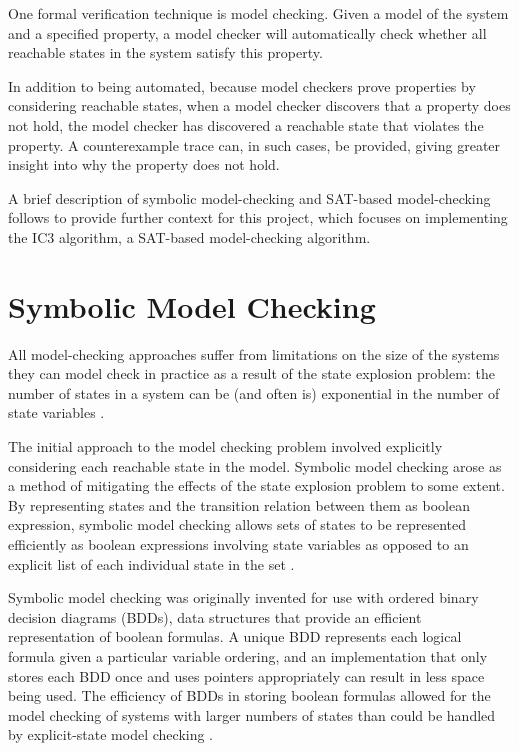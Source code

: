 \documentclass[12pt,a4paper,twoside,openright]{report}
\begin{document}

One formal verification technique is model checking.
Given a model of the system
and a specified property, a model checker will automatically check
whether all reachable states in the system satisfy this property.

In addition to being automated, because model checkers prove
properties by considering reachable states, when a model checker
discovers that a property does not hold, the model checker has
discovered a reachable state that violates the property. A
counterexample trace can, in such cases, be provided, giving
greater insight into why the property does not hold.

A brief description of symbolic model-checking and SAT-based model-checking
follows to provide further context for this project, which focuses on
implementing the IC3 algorithm, a SAT-based model-checking algorithm.


\section{Symbolic Model Checking}

All model-checking approaches suffer from limitations on the size
of the systems they can model check in practice as a result of
the state explosion problem: the number of
states in a system can be (and often is) exponential in the
number of state variables \cite{clarke12}. 

The initial approach to the model checking problem involved explicitly
considering each reachable state in the model.
Symbolic model checking arose as a method of mitigating the effects of
the state explosion problem to some extent. By representing
states and the transition relation between them as boolean
expression, symbolic model checking allows sets of states to be
represented efficiently as boolean expressions involving state variables
as opposed to an explicit list of each individual state in the set
\cite{mcmillan92}. 

Symbolic model checking was originally invented for use with ordered
binary decision diagrams (BDDs), data structures that provide an efficient
representation of boolean formulas. A unique BDD represents each logical
formula given a particular variable ordering, and an implementation that
only stores each BDD once and uses pointers appropriately can result in
less space being used.
The efficiency of BDDs in storing boolean formulas allowed for the model
checking of systems with larger numbers of states than could be handled
by explicit-state model checking \cite{mcmillan92}.
\end{document}
